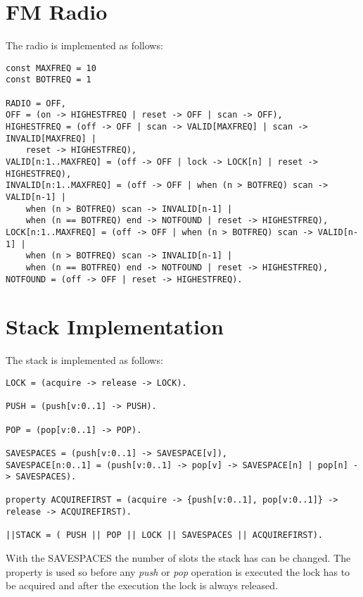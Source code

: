 \documentclass{report}
\begin{document}
	\newpage	
	
	\section{FM Radio}
	\startsection
		The radio is implemented as follows:
		\startsubsection
			\begin{verbatim}
const MAXFREQ = 10
const BOTFREQ = 1

RADIO = OFF,
OFF = (on -> HIGHESTFREQ | reset -> OFF | scan -> OFF),
HIGHESTFREQ = (off -> OFF | scan -> VALID[MAXFREQ] | scan -> INVALID[MAXFREQ] | 
	reset -> HIGHESTFREQ),
VALID[n:1..MAXFREQ] = (off -> OFF | lock -> LOCK[n] | reset -> HIGHESTFREQ),
INVALID[n:1..MAXFREQ] = (off -> OFF | when (n > BOTFREQ) scan -> VALID[n-1] | 
	when (n > BOTFREQ) scan -> INVALID[n-1] | 
	when (n == BOTFREQ) end -> NOTFOUND | reset -> HIGHESTFREQ),
LOCK[n:1..MAXFREQ] = (off -> OFF | when (n > BOTFREQ) scan -> VALID[n-1] | 
	when (n > BOTFREQ) scan -> INVALID[n-1] | 
	when (n == BOTFREQ) end -> NOTFOUND | reset -> HIGHESTFREQ),
NOTFOUND = (off -> OFF | reset -> HIGHESTFREQ).
			\end{verbatim}
		\closesection
	\closesection
	
	\section{Stack Implementation}
	\startsection
		The stack is implemented as follows:
		\startsubsection
			\begin{verbatim}
LOCK = (acquire -> release -> LOCK).

PUSH = (push[v:0..1] -> PUSH).

POP = (pop[v:0..1] -> POP).

SAVESPACES = (push[v:0..1] -> SAVESPACE[v]),
SAVESPACE[n:0..1] = (push[v:0..1] -> pop[v] -> SAVESPACE[n] | pop[n] -> SAVESPACES).

property ACQUIREFIRST = (acquire -> {push[v:0..1], pop[v:0..1]} -> release -> ACQUIREFIRST).

||STACK = ( PUSH || POP || LOCK || SAVESPACES || ACQUIREFIRST).
			\end{verbatim}
		\closesection
		With the SAVESPACES the number of slots the stack has can be changed. The property is used  so before any \textit{push} or \textit{pop} operation is executed the lock has to be acquired and after the execution the lock is always released.
	\closesection
\end{document}
